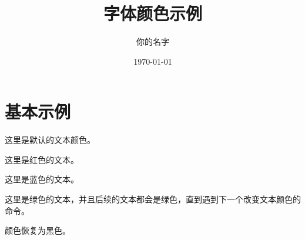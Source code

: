 \documentclass[a4paper,12pt]{ctexart}
\title{字体颜色示例}
\author{你的名字}
\date{\today}
\begin{document}
\maketitle

\section{基本示例}

这里是默认的文本颜色。

\color{red} 这里是红色的文本。

\color{blue} 这里是蓝色的文本。

\color{green} 这里是绿色的文本，并且后续的文本都会是绿色，直到遇到下一个改变文本颜色的命令。

\color{black} 颜色恢复为黑色。
\end{document}
